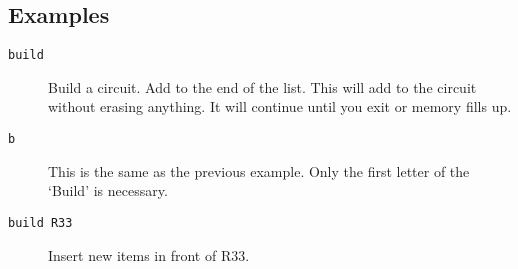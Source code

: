 \subsection{Examples}

\begin{description}

\item[{\tt build}] Build a circuit.  Add to the end of the list.  This will
add to the circuit without erasing anything.  It will continue until you
exit or memory fills up.

\item[{\tt b}] This is the same as the previous example.  Only the first
letter of the `Build' is necessary.

\item[{\tt build R33}]	Insert new items in front of R33.

\end{description}
